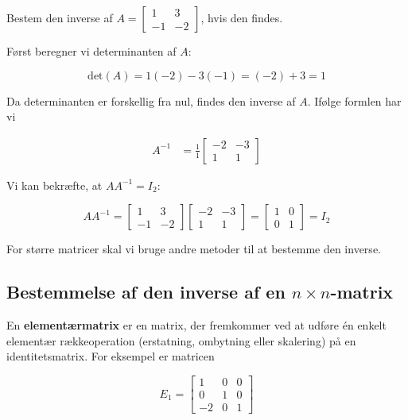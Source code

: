\begin{example} Bestem den inverse af $A=\left[\begin{array}{cc}1 & 3 \\ -1 & -2\end{array}\right]$, hvis den findes.
    
\end{example}

\begin{solution}
    Først beregner vi determinanten af $A$:

    \[
    \text{det}(A)=1(-2)-3(-1)=(-2)+3=1
    \]

    Da determinanten er forskellig fra nul, findes den inverse af $A$. Ifølge formlen har vi

    \[
    \begin{aligned}
    A^{-1} & =\frac{1}{1}\left[\begin{array}{cc}-2 & -3 \\ 1 & 1\end{array}\right]
    \end{aligned}
    \]

    Vi kan bekræfte, at $A A^{-1}=I_2$:

    \[
        A A^{-1}=\left[\begin{array}{cc}
    1 & 3 \\
    -1 & -2
    \end{array}\right]\left[\begin{array}{cc}
    -2 & -3 \\
    1 & 1
    \end{array}\right]=\left[\begin{array}{ll}
    1 & 0 \\
    0 & 1
    \end{array}\right] =I_2
    \]

\end{solution}

For større matricer skal vi bruge andre metoder til at bestemme den inverse.

\subsection*{Bestemmelse af den inverse af en $n \times n$-matrix}
En \textbf{elementærmatrix} er en matrix, der fremkommer ved at udføre én enkelt elementær rækkeoperation (erstatning, ombytning eller skalering) på en identitetsmatrix. For eksempel er matricen

\[
E_1=\left[\begin{array}{ccc}
1 & 0 & 0 \\
0 & 1 & 0 \\
-2 & 0 & 1
\end{array}\right]
\]

